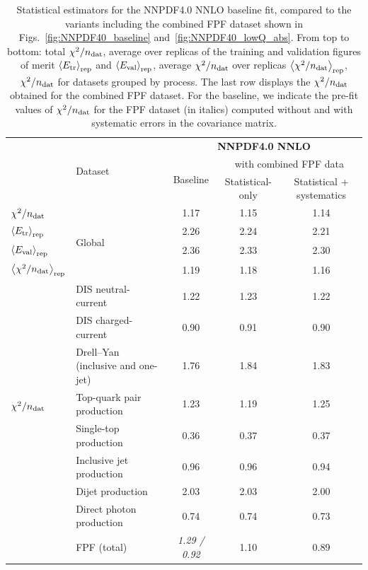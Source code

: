 \begin{table}[!t]
  \centering
  \footnotesize
  \renewcommand{\arraystretch}{1.30}
  \begin{tabularx}{\textwidth}{X|l|c|c|c}
  \toprule
  & \multirow{3}{*}{Dataset}
  & \multicolumn{3}{c}{\bf NNPDF4.0 NNLO} \\
  &
  & \multirow{2}{*}{Baseline}
  & \multicolumn{2}{c}{with combined FPF data}  \\
  &
  &
  & Statistical-only  & Statistical + systematics  \\
  \midrule
  $\chi^2/n_{\rm dat}$ &  \multirow{4}{*}{Global}  & 1.17  &  1.15   & 1.14   \\
  $\left\langle E_{\rm tr}\right\rangle_{\rm rep}$
  &  &  2.26  &  2.24   & 2.21   \\
  $\left\langle E_{\rm val}\right\rangle_{\rm rep}$
  & & 2.36    &   2.33  & 2.30  \\
  $\left\langle \chi^2/n_{\rm dat}\right\rangle_{\rm rep}$
  & &   1.19   &    1.18    & 1.16  \\
  \midrule
  \multirow{8}{*}{$\chi^2/n_{\rm dat}$}
  & DIS neutral-current                     &  1.22    &  1.23    &   1.22   \\
  & DIS charged-current                     &   0.90  &   0.91    &  0.90    \\
  & Drell--Yan (inclusive and one-jet)      &  1.76   &   1.84    &   1.83   \\
  & Top-quark pair production               &  1.23   &   1.19    &  1.25     \\
  & Single-top production                   &  0.36    &   0.37   &   0.37    \\
  & Inclusive jet production                &  0.96    &  0.96      &   0.94    \\
  & Dijet production                        &  2.03     &    2.03    &   2.00    \\
  & Direct photon production                 &  0.74   &   0.74     &    0.73   \\
  & FPF (total)                 &  {\it 1.29  / 0.92}  &   1.10     &   0.89    \\
  \bottomrule
\end{tabularx}
\vspace{0.2cm}
\caption{\small Statistical estimators for the NNPDF4.0 NNLO
  baseline fit, compared to the variants including
  the combined FPF dataset shown in Figs.~\ref{fig:NNPDF40_baseline}
  and~\ref{fig:NNPDF40_lowQ_abs}.
  From top to bottom: total $\chi^2/n_{\rm dat}$, average
  over replicas of the training and validation figures of merit
  $\left\langle E_{\rm tr}\right\rangle_{\rm rep}$ and $\left\langle E_{\rm val}\right\rangle_{\rm rep}$,
  average $\chi^2/n_{\rm dat}$ over replicas $\left\langle \chi^2/n_{\rm dat}\right\rangle_{\rm rep}$,
  $\chi^2/n_{\rm dat}$ for datasets grouped by process.
  The last row displays the $\chi^2/n_{\rm dat}$ obtained for the combined FPF dataset.
  For the baseline, we indicate the pre-fit values of $\chi^2/n_{\rm dat}$  for the  FPF dataset (in italics)
  computed without
  and with systematic errors in the covariance matrix.
  \label{tab:chi2_nnpdf40_baseline}
}
\end{table}
